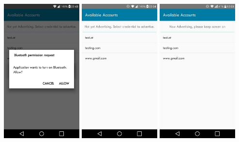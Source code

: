 \documentclass{beamer}
\begin{document}
\begin{frame}{}
\vfill
\centering
\includegraphics[width=0.31\textwidth]{images/BT_english.jpg}
\hspace{0.1cm}
\includegraphics[width=0.31\textwidth]{images/AvailableAccounts.jpg}
\hspace{0.1cm}
\includegraphics[width=0.31\textwidth]{images/NowAdvertising.jpg}
\vfill
%
\note{
}
\end{frame}
\end{document}
